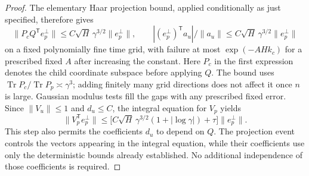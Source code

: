 \begin{proof}
The elementary Haar projection bound, applied conditionally
as just specified, therefore gives
\[
 \|P_cQ^{\mathsf T}e_p^\perp\|
       \le C\sqrt H\,\gamma^{3/2}\|e_p^\perp\|,
 \qquad
 |(e_p^\perp)^{\mathsf T}a_u|/\|a_u\|
       \le C\sqrt H\,\gamma^{3/2}\|e_p^\perp\|
\]
on a fixed polynomially fine time grid, with failure at most $\exp(-A Hk_c)$
for a prescribed fixed $A$ after increasing the constant. Here $P_c$ in the
first expression denotes the child coordinate subspace before applying $Q$.
The bound uses $\operatorname{Tr}P_c/\operatorname{Tr}P_p \asymp\gamma^3$;
adding finitely many grid directions does not affect it once $n$ is large.
Gaussian modulus tests fill the gaps with any prescribed fixed error. Since
$\|V_u\|\le1$ and $d_u\le C$, the integral equation for $V_p$ yields
\begin{equation}\label{cap:transverse-flow}
 \|V_p^{\mathsf T}e_p^\perp\|
 \le\bigl[C\sqrt H\,\gamma^{3/2}
                (1+|\log\gamma|)+\tau\bigr]\|e_p^\perp\|.
\end{equation}
This step also permits the coefficients $d_u$ to depend on $Q$. The projection
event controls the vectors appearing in the integral equation, while their
coefficients use only the deterministic bounds already established. No
additional independence of those coefficients is required.


\end{proof}
